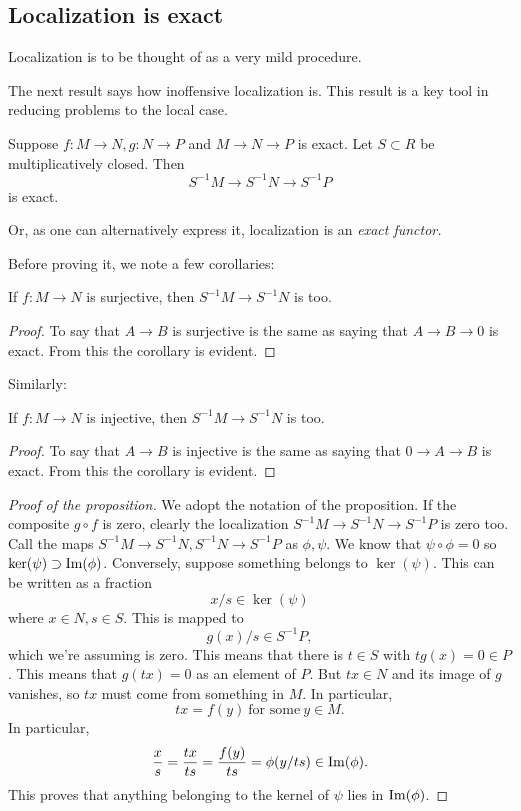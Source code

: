 \subsection{Localization is exact}
Localization is to be thought of as a very mild procedure.

The next result says how inoffensive localization is. This result is a key
tool in reducing problems to the local case.
\begin{proposition} 
Suppose $f: M \to N, g: N \to P$ and  $M \to N \to P$ is exact. Let $S \subset
R$ be multiplicatively closed. Then
\[ S^{-1}M \to S^{-1}N \to S^{-1}P  \]
is exact.
\end{proposition} 

Or, as one can alternatively express it, localization is an \emph{exact
functor.}

Before proving it, we note a few corollaries:
\begin{corollary} 
If $f: M \to N$ is surjective, then $S^{-1}M \to S^{-1}N$ is too. 
\end{corollary} 
\begin{proof} 
To say that $A \to B$ is surjective is the same as saying that $A \to B \to 0$
is exact. From this the corollary is evident.
\end{proof} 

Similarly:
\begin{corollary} 
If $f: M \to N$ is injective, then  $S^{-1}M \to S^{-1}N$ is too. 
\end{corollary} 
\begin{proof} 
To say that $A \to B$ is injective is the same as saying that $0 \to A \to B $
is exact. From this the corollary is evident.
\end{proof} 

\begin{proof}[Proof of the proposition] We adopt the notation of the
proposition.
If the composite $g\circ f$ is zero, clearly the localization $S^{-1}M \to
S^{-1}N \to S^{-1}P$ is zero too.
Call the maps $S^{-1}M \to S^{-1}N, S^{-1}N \to S^{-1}P$ as $\phi, \psi$. We
know that $\psi \circ \phi  = 0$ so $\ker(\psi) \supset \mathrm{Im}(\phi)$. Conversely,
suppose  something belongs to $\ker(\psi).  $ This can be written as a fraction 
\[ x/s \in \ker(\psi)  \]
where $x \in N, s \in S$. This is mapped to 
\[ g(x)/s \in S^{-1}P,  \]
which we're assuming is zero. This means that there is $t \in S$ with $tg(x) =
0 \in P$.  This means that $g(tx)=0$ as an element of $P$.  But $tx \in N$ and
its image of $g$ vanishes, so $tx$ must come from something in $M$.  In
particular,
\[ tx = f(y) \ \text{for some} \ y \in M.  \]
In particular, 
\[ \frac{x}{s}  = \frac{tx}{ts} = \frac{f(y)}{ts} = \phi( y/ts) \in \mathrm{Im}(\phi).  \]
This proves that anything belonging to the kernel of $\psi$ lies in $\mathrm{Im}(\phi)$. 
\end{proof} 

